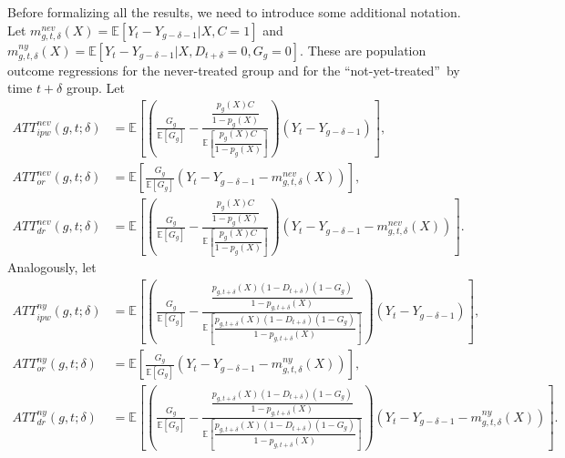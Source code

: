 \documentclass[11pt]{article}%
\theoremstyle{plain}
\numberwithin{sassumption}{section}
\numberwithin{equation}{section}
\begin{document}
Before formalizing all the results, we need to introduce some additional
notation. Let $m_{g,t,\delta}^{nev}\left(  X\right)  =\mathbb{E}\left[
Y_{t}-Y_{g-\delta-1}|X,C=1\right]  $ and $m_{g,t,\delta}^{ny}\left(  X\right)
=\mathbb{E}\left[  Y_{t}-Y_{g-\delta-1}|X,D_{t+\delta}=0,G_{g}=0\right]  $.
These are population outcome regressions for the never-treated group and for
the \textquotedblleft not-yet-treated\textquotedblright\ by time $t+\delta$
group. Let
\begin{align}
ATT_{ipw}^{nev}\left(  g,t;\delta\right)   &  =\mathbb{E}\left[  \left(
\frac{G_{g}}{\mathbb{E}\left[  G_{g}\right]  }-\frac{\dfrac{p_{g}\left(
X\right)  C}{1-p_{g}\left(  X\right)  }}{\mathbb{E}\left[  \dfrac{p_{g}\left(
X\right)  C}{1-p_{g}\left(  X\right)  }\right]  }\right)  \left(
Y_{t}-Y_{g-\delta-1}\right)  \right]  ,\label{eqn:att_ipw_nev}\\
ATT_{or}^{nev}\left(  g,t;\delta\right)   &  =\mathbb{E}\left[  \frac{G_{g}%
}{\mathbb{E}\left[  G_{g}\right]  }\left(  Y_{t}-Y_{g-\delta-1}-m_{g,t,\delta
}^{nev}\left(  X\right)  \right)  \right]  ,\label{eqn:att_or_nev}\\
ATT_{dr}^{nev}\left(  g,t;\delta\right)   &  =\mathbb{E}\left[  \left(
\frac{G_{g}}{\mathbb{E}\left[  G_{g}\right]  }-\frac{\dfrac{p_{g}\left(
X\right)  C}{1-p_{g}\left(  X\right)  }}{\mathbb{E}\left[  \dfrac{p_{g}\left(
X\right)  C}{1-p_{g}\left(  X\right)  }\right]  }\right)  \left(
Y_{t}-Y_{g-\delta-1}-m_{g,t,\delta}^{nev}\left(  X\right)  \right)  \right]  .
\label{eqn:att_dr_nev}%
\end{align}
Analogously, let%
\begin{align}
ATT_{ipw}^{ny}\left(  g,t;\delta\right)   &  =\mathbb{E}\left[  \left(
\frac{G_{g}}{\mathbb{E}\left[  G_{g}\right]  }-\frac{\dfrac{p_{g,t+\delta
}\left(  X\right)  \left(  1-D_{t+\delta}\right)  \left(  1-G_{g}\right)
}{1-p_{g,t+\delta}\left(  X\right)  }}{\mathbb{E}\left[  \dfrac{p_{g,t+\delta
}\left(  X\right)  \left(  1-D_{t+\delta}\right)  \left(  1-G_{g}\right)
}{1-p_{g,t+\delta}\left(  X\right)  }\right]  }\right)  \left(  Y_{t}%
-Y_{g-\delta-1}\right)  \right]  ,\label{eqn:att_ipw_ny}\\
ATT_{or}^{ny}\left(  g,t;\delta\right)   &  =\mathbb{E}\left[  \frac{G_{g}%
}{\mathbb{E}\left[  G_{g}\right]  }\left(  Y_{t}-Y_{g-\delta-1}-m_{g,t,\delta
}^{ny}\left(  X\right)  \right)  \right]  ,\label{eqn:att_or_ny}\\
ATT_{dr}^{ny}\left(  g,t;\delta\right)   &  =\mathbb{E}\left[  \left(
\frac{G_{g}}{\mathbb{E}\left[  G_{g}\right]  }-\frac{\dfrac{p_{g,t+\delta
}\left(  X\right)  \left(  1-D_{t+\delta}\right)  \left(  1-G_{g}\right)
}{1-p_{g,t+\delta}\left(  X\right)  }}{\mathbb{E}\left[  \dfrac{p_{g,t+\delta
}\left(  X\right)  \left(  1-D_{t+\delta}\right)  \left(  1-G_{g}\right)
}{1-p_{g,t+\delta}\left(  X\right)  }\right]  }\right)  \left(  Y_{t}%
-Y_{g-\delta-1}-m_{g,t,\delta}^{ny}\left(  X\right)  \right)  \right]  .
\label{eqn:att_dr_ny}%
\end{align}
\end{document}
